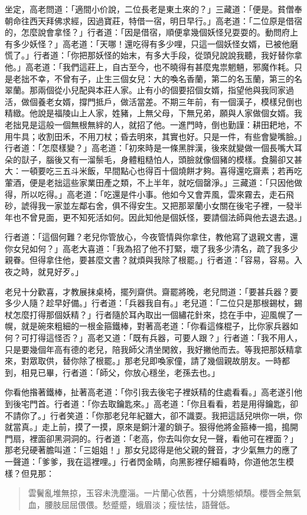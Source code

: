 坐定，高老問道：「適間小价說，二位長老是東土來的？」三藏道：「便是。貧僧奉朝命往西天拜佛求經，因過寶莊，特借一宿，明日早行。」高老道：「二位原是借宿的，怎麼說會拿怪？」行者道：「因是借宿，順便拿幾個妖怪兒耍耍的。動問府上有多少妖怪？」高老道：「天哪！還吃得有多少哩，只這一個妖怪女婿，已被他磨慌了。」行者道：「你把那妖怪的始末，有多大手段，從頭兒說說我聽，我好替你拿他。」高老道：「我們這莊上，自古至今，也不曉得有甚麼鬼祟魍魎，邪魔作耗。只是老拙不幸，不曾有子，止生三個女兒：大的喚名香蘭，第二的名玉蘭，第三的名翠蘭。那兩個從小兒配與本莊人家。止有小的個要招個女婿，指望他與我同家過活，做個養老女婿，撐門抵戶，做活當差。不期三年前，有一個漢子，模樣兒倒也精緻。他說是福陵山上人家，姓豬，上無父母，下無兄弟，願與人家做個女婿。我老拙見是這般一個無根無絆的人，就招了他。一進門時，倒也勤謹：耕田耙地，不用牛具；收割田禾，不用刀杖；昏去明來，其實也好。只是一件，有些會變嘴臉。」行者道：「怎麼樣變？」高老道：「初來時是一條黑胖漢，後來就變做一個長嘴大耳朵的獃子，腦後又有一溜鬃毛，身體粗糙怕人，頭臉就像個豬的模樣。食腸卻又甚大：一頓要吃三五斗米飯，早間點心也得百十個燒餅才夠。喜得還吃齋素；若再吃葷酒，便是老拙這些家業田產之類，不上半年，就吃個罄淨。」三藏道：「只因他做得，所以吃得。」高老道：「吃還是件小事。他如今又會弄風，雲來霧去，走石飛砂，諕得我一家並左鄰右舍，俱不得安生。又把那翠蘭小女關在後宅子裡，一發半年也不曾見面，更不知死活如何。因此知他是個妖怪，要請個法師與他去退去退。」

行者道：「這個何難？老兒你管放心，今夜管情與你拿住，教他寫了退親文書，還你女兒如何？」高老大喜道：「我為招了他不打緊，壞了我多少清名，疏了我多少親眷。但得拿住他，要甚麼文書？就煩與我除了根罷。」行者道：「容易，容易。入夜之時，就見好歹。」

老兒十分歡喜，才教展抹桌椅，擺列齋供。齋罷將晚，老兒問道：「要甚兵器？要多少人隨？趁早好備。」行者道：「兵器我自有。」老兒道：「二位只是那根錫杖，錫杖怎麼打得那個妖精？」行者隨於耳內取出一個繡花針來，捻在手中，迎風幌了一幌，就是碗來粗細的一根金箍鐵棒，對著高老道：「你看這條棍子，比你家兵器如何？可打得這怪否？」高老又道：「既有兵器，可要人跟？」行者道：「我不用人，只是要幾個年高有德的老兒，陪我師父清坐閑敘，我好撇他而去。等我把那妖精拿來，對眾取供，替你除了根罷。」那老兒即喚家僮，請了幾個親故朋友。一時都到，相見已畢，行者道：「師父，你放心穩坐，老孫去也。」

你看他揝著鐵棒，扯著高老道：「你引我去後宅子裡妖精的住處看看。」高老遂引他到後宅門首。行者道：「你去取鑰匙來。」高老道：「你且看看，若是用得鑰匙，卻不請你了。」行者笑道：「你那老兒年紀雖大，卻不識耍。我把這話兒哄你一哄，你就當真。」走上前，摸了一摸，原來是銅汁灌的鎖子。狠得他將金箍棒一搗，搗開門扇，裡面卻黑洞洞的。行者道：「老高，你去叫你女兒一聲，看他可在裡面？」那老兒硬著膽叫道：「三姐姐！」那女兒認得是他父親的聲音，才少氣無力的應了一聲道：「爹爹，我在這裡哩。」行者閃金睛，向黑影裡仔細看時，你道他怎生模樣？但見那：
\begin{quote}
雲鬢亂堆無掠，玉容未洗塵淄。一片蘭心依舊，十分嬌態傾頹。櫻唇全無氣血，腰肢屈屈偎偎。愁蹙蹙，蛾眉淡；瘦怯怯，語聲低。
\end{quote}

